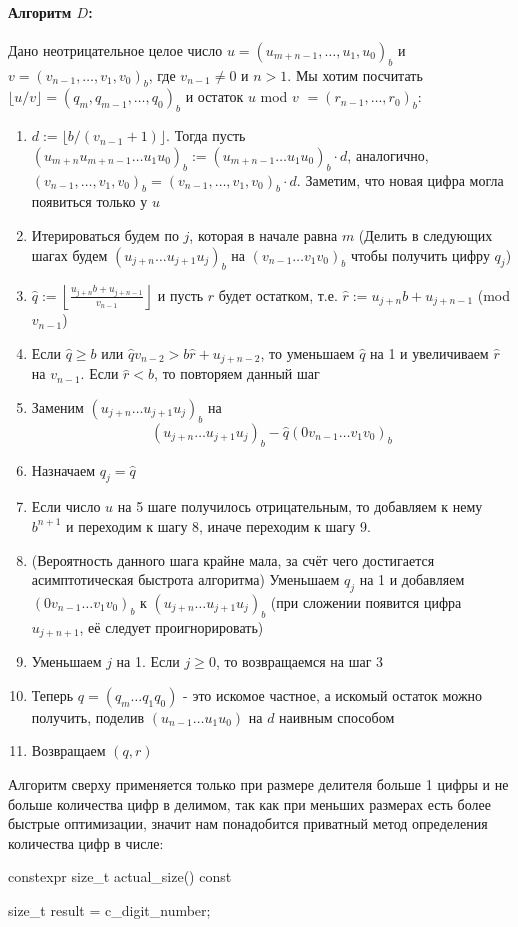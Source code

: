 \begin{itemize}
   \paragraph{Алгоритм $D$:} Дано неотрицательное целое число $u = (u_{m+n-1},\dots,u_1,u_0)_b$ и $v = (v_{n-1},\dots,v_1,v_0)_b$, где $v_{n-1}\neq 0$ и $n>1$. Мы хотим посчитать $\lfloor u/v\rfloor = (q_m,q_{m-1},\dots,q_0)_b$ и остаток $u$ mod $v$ $= (r_{n-1},\dots,r_0)_b$:

   \begin{enumerate}
     \item $d:=\lfloor b/(v_{n-1}+1)\rfloor$. Тогда пусть $(u_{m+n}u_{m+n-1}\dots u_1u_0)_b:=(u_{m+n-1}\dots u_1u_0)_b\cdot d$, аналогично, $(v_{n-1},\dots,v_1,v_0)_b =(v_{n-1},\dots,v_1,v_0)_b\cdot d$. Заметим, что новая цифра могла появиться только у $u$
     \item Итерироваться будем по $j$, которая в начале равна $m$ (Делить в следующих шагах будем $(u_{j+n}\dots u_{j+1}u_j)_b$ на $(v_{n-1}\dots v_1v_0)_b$ чтобы получить цифру $q_j$) 
     \item $\hat{q} := \left\lfloor \frac{u_{j+n}b + u_{j+n-1}}{v_{n-1}}\right\rfloor$ и пусть $\hat{r}$ будет остатком, т.е. $\hat{r} :=u_{j+n}b + u_{j+n-1}$ (mod $v_{n-1}$)
     \item Если $\hat{q}\geqslant b$ или $\hat{q}v_{n-2}>b\hat{r} + u_{j+n-2}$, то уменьшаем $\hat{q}$ на 1 и увеличиваем $\hat{r}$ на $v_{n-1}$. Если $\hat{r}<b$, то повторяем данный шаг
     \item Заменим $(u_{j+n}\dots u_{j+1}u_j)_b$ на
     \[(u_{j+n}\dots u_{j+1}u_j)_b - \hat{q}(0v_{n-1}\dots v_1v_0)_b\]
     \item Назначаем $q_j = \hat{q}$
     \item Если число $u$ на 5 шаге получилось отрицательным, то добавляем к нему $b^{n+1}$ и переходим к шагу 8, иначе переходим к шагу 9.
     \item (Вероятность данного шага крайне мала, за счёт чего достигается асимптотическая быстрота алгоритма) Уменьшаем $q_j$ на 1 и добавляем $(0v_{n-1}\dots v_1v_0)_b$ к $(u_{j+n}\dots u_{j+1}u_j)_b$ (при сложении появится цифра $u_{j+n+1}$, её следует проигнорировать)
     \item Уменьшаем $j$ на 1. Если $j\geqslant 0$, то возвращаемся на шаг 3
     \item Теперь $q=(q_m\dots q_1q_0)$ - это искомое частное, а искомый остаток можно получить, поделив $(u_{n-1}\dots u_1u_0)$ на $d$ наивным способом 
     \item Возвращаем $(q,r)$
   \end{enumerate}
   Алгоритм сверху применяется только при размере делителя больше 1 цифры и не больше количества цифр в делимом, так как при меньших размерах есть более быстрые оптимизации, значит нам понадобится приватный метод определения количества цифр в числе:
   \begin{cppcode}
constexpr size_t actual_size() const {
    size_t result = c_digit_number;

}
\end{cppcode}
\end{itemize}
